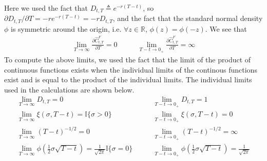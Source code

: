 \documentclass{article}
\numberwithin{equation}{section}
\begin{document}
Here we used the fact that $ D_{t, T} \triangleq e^{-r(T - t)} $, so
$ \partial D_{t, T} / \partial T = -re^{-r(T - t)} = -rD_{t, T} $, and the fact
that the standard normal density $ \phi $ is symmetric around the origin, i.e.
$ \forall z \in \mathbb{R} $, $ \phi(z) = \phi(-z) $. We see that
\begin{equation*}
    \begin{array}{cc}
        \displaystyle \lim_{T \rightarrow \infty}
        \frac{\partial\hat{C}_{t, T}^F}{\partial T} = 0 \quad & \quad
        \displaystyle \lim_{T - t \rightarrow 0_+}
        \frac{\partial\hat{C}_{t, T}^F}{\partial T} = \infty
    \end{array}
\end{equation*}
To compute the above limits, we used the fact that the limit of the product of
continuous functions exists when the individual limits of the continous
functions exist and is equal to the product of the individual limits. The
individual limits used in the calculations are shown below.
\begin{equation*}
    \begin{array}{cccc}
        \displaystyle \lim_{T \rightarrow \infty}D_{t, T} = 0
        \quad & \quad
        \displaystyle \lim_{T - t \rightarrow 0_+}D_{t, T} = 1 \\
        \displaystyle \lim_{T \rightarrow \infty}\xi(\sigma, T - t) =
        \mathbb{I}\{\sigma > 0\}
        \quad & \quad
        \displaystyle \lim_{T - t \rightarrow 0_+}\xi(\sigma, T - t) = 0 \\
        \displaystyle \lim_{T \rightarrow \infty}(T - t)^{-1 / 2} = 0
        \quad & \quad
        \displaystyle \lim_{T - t \rightarrow 0_+}(T - t)^{-1 / 2} = \infty \\
        \displaystyle \lim_{T \rightarrow \infty}\phi\left(
            \frac{1}{2}\sigma\sqrt{T - t}
        \right) = \frac{1}{\sqrt{2\pi}}\mathbb{I}\{\sigma = 0\}
        \quad & \quad
        \displaystyle \lim_{T - t \rightarrow 0_+}\phi\left(
            \frac{1}{2}\sigma\sqrt{T - t}
        \right) = \frac{1}{\sqrt{2\pi}}
    \end{array}
\end{equation*}

\end{document}

